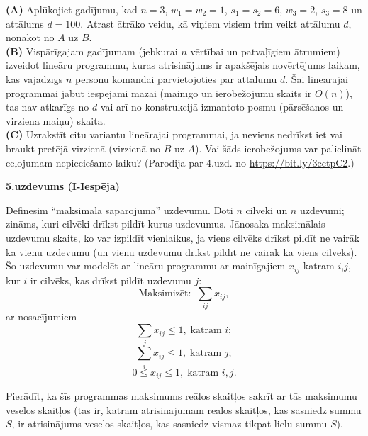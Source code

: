 \documentclass[a4paper]{article}
\begin{document}
\vspace{4pt}
{\bf (A)} Aplūkojiet gadījumu, kad $n = 3$, 
$w_1 = w_2 = 1$, $s_1 = s_2 = 6$, $w_3 = 2$, $s_3 = 8$ un
attālums $d = 100$. Atrast ātrāko veidu, 
kā viņiem visiem trim veikt
attālumu $d$, nonākot no $A$ uz $B$.\\
{\bf (B)} Vispārīgajam gadījumam (jebkurai $n$ 
vēr\-tī\-bai un patvaļīgiem ātrumiem) izveidot lineāru programmu, 
kuras atrisinājums ir apakšējais 
no\-vēr\-tē\-jums laikam, 
kas vajadzīgs $n$ personu komandai 
pārvietojoties par attālumu $d$. 
Šai li\-ne\-ā\-ra\-jai programmai jābūt iespējami mazai 
(mainīgo un ierobežojumu skaits ir $O(n)$), 
tas nav atkarīgs no $d$ vai arī no konstrukcijā 
izmantoto posmu (pār\-sē\-ša\-nos un virziena maiņu) skaita.\\
{\bf (C)} Uzrakstīt citu variantu lineārajai programmai, ja neviens nedrīkst iet vai braukt
pretējā virzienā (virzienā no $B$ uz $A$). Vai šāds ierobežojums var palielināt 
ceļojumam nepieciešamo lai\-ku? (Parodija 
par 4.uzd. no \url{https://bit.ly/3ectpC2}.)










\vspace{20pt}
{\bf 5.uzdevums (I-Iespēja)}

Definēsim ``maksimālā sapārojuma'' uzdevumu. 
Doti $n$ cilvēki un $n$ uzdevumi; zināms, kuri cilvēki drīkst pildīt kurus uzdevumus. 
Jānosaka maksimālais uzdevumu
skaits, ko var izpildīt vienlaikus, ja viens cilvēks drīkst pildīt ne vairāk
kā vienu uzdevumu (un vienu uzdevumu drīkst pildīt ne vairāk kā viens
cilvēks). Šo uzdevumu var modelēt ar lineāru programmu ar mainīgajiem
$x_{ij}$ katram $i$,$j$, kur $i$ ir cilvēks, kas drīkst pildīt uzdevumu $j$:
$$\text{Maksimizēt:}\;\;\sum\limits_{ij} x_{ij},$$
ar nosacījumiem
$$\sum\limits_{j} x_{ij} \leq 1,\;\mbox{katram $i$};$$
$$\sum\limits_{i} x_{ij} \leq 1,\;\mbox{katram $j$};$$
$$0 \leq x_{ij} \leq 1,\;\mbox{katram $i,j$}.$$

Pierādīt, ka šīs programmas maksimums reālos skaitļos sakrīt ar tās 
maksimumu veselos skaitļos (tas ir, katram atrisinājumam reālos skaitļos, kas
sasniedz summu $S$, ir atrisinājums veselos skait\-ļos, kas sasniedz vismaz
tikpat lielu summu $S$).
\end{document}
